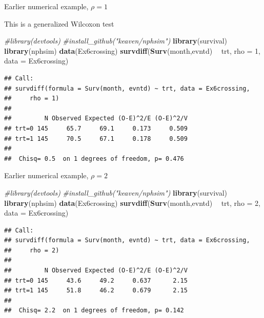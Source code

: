 \documentclass[ignorenonframetext,]{beamer}
\newenvironment{Shaded}{\begin{snugshade}}{\end{snugshade}}
\newcommand{\CommentTok}[1]{\textcolor[rgb]{0.56,0.35,0.01}{\textit{#1}}}
\newcommand{\DataTypeTok}[1]{\textcolor[rgb]{0.13,0.29,0.53}{#1}}
\newcommand{\DecValTok}[1]{\textcolor[rgb]{0.00,0.00,0.81}{#1}}
\newcommand{\KeywordTok}[1]{\textcolor[rgb]{0.13,0.29,0.53}{\textbf{#1}}}
\newcommand{\NormalTok}[1]{#1}
\newcommand{\OperatorTok}[1]{\textcolor[rgb]{0.81,0.36,0.00}{\textbf{#1}}}
\newcommand{\StringTok}[1]{\textcolor[rgb]{0.31,0.60,0.02}{#1}}
\begin{document}
\begin{frame}[fragile]{%
\protect\hypertarget{earlier-numerical-example-rho-1}{%
Earlier numerical example, \(\rho = 1\)}}

\small

This is a generalized Wilcoxon test

\begin{Shaded}
\begin{Highlighting}[]
\CommentTok{#library(devtools)}
\CommentTok{#install_github("keaven/nphsim")}
\KeywordTok{library}\NormalTok{(survival)}
\KeywordTok{library}\NormalTok{(nphsim)}
\KeywordTok{data}\NormalTok{(Ex6crossing)}
\KeywordTok{survdiff}\NormalTok{(}\KeywordTok{Surv}\NormalTok{(month,evntd) }\OperatorTok{~}\StringTok{ }\NormalTok{trt, }\DataTypeTok{rho =} \DecValTok{1}\NormalTok{, }\DataTypeTok{data =}\NormalTok{ Ex6crossing)}
\end{Highlighting}
\end{Shaded}

\begin{verbatim}
## Call:
## survdiff(formula = Surv(month, evntd) ~ trt, data = Ex6crossing, 
##     rho = 1)
## 
##         N Observed Expected (O-E)^2/E (O-E)^2/V
## trt=0 145     65.7     69.1     0.173     0.509
## trt=1 145     70.5     67.1     0.178     0.509
## 
##  Chisq= 0.5  on 1 degrees of freedom, p= 0.476
\end{verbatim}

\end{frame}

\begin{frame}[fragile]{%
\protect\hypertarget{earlier-numerical-example-rho-2}{%
Earlier numerical example, \(\rho = 2\)}}

\small

\begin{Shaded}
\begin{Highlighting}[]
\CommentTok{#library(devtools)}
\CommentTok{#install_github("keaven/nphsim")}
\KeywordTok{library}\NormalTok{(survival)}
\KeywordTok{library}\NormalTok{(nphsim)}
\KeywordTok{data}\NormalTok{(Ex6crossing)}
\KeywordTok{survdiff}\NormalTok{(}\KeywordTok{Surv}\NormalTok{(month,evntd) }\OperatorTok{~}\StringTok{ }\NormalTok{trt, }\DataTypeTok{rho =} \DecValTok{2}\NormalTok{, }\DataTypeTok{data =}\NormalTok{ Ex6crossing)}
\end{Highlighting}
\end{Shaded}

\begin{verbatim}
## Call:
## survdiff(formula = Surv(month, evntd) ~ trt, data = Ex6crossing, 
##     rho = 2)
## 
##         N Observed Expected (O-E)^2/E (O-E)^2/V
## trt=0 145     43.6     49.2     0.637      2.15
## trt=1 145     51.8     46.2     0.679      2.15
## 
##  Chisq= 2.2  on 1 degrees of freedom, p= 0.142
\end{verbatim}

\end{frame}
\end{document}
